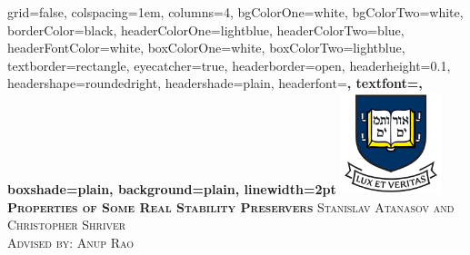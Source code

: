 \documentclass[landscape,final,a0paper,fontscale=0.26]{baposter}
\begin{document}
\begin{poster}%
  {
  grid=false,
  colspacing=1em,
  columns=4,
  bgColorOne=white,
  bgColorTwo=white,
  borderColor=black,
  headerColorOne=lightblue,
  headerColorTwo=blue,
  headerFontColor=white,
  boxColorOne=white,
  boxColorTwo=lightblue,
  textborder=rectangle,
  eyecatcher=true,
  headerborder=open,
  headerheight=0.1\textheight,
  headershape=roundedright,
  headershade=plain,
  headerfont=\Large\bf\textsc, %
  textfont={\setlength{\parindent}{1.5em}},
  boxshade=plain,
  background=plain,
  linewidth=2pt
  }
    {\includegraphics[height=8em]{images/Yale}} 
  {\bf\textsc{Properties of Some Real Stability Preservers}\vspace{0.5em}}
  {\textsc{ Stanislav Atanasov and Christopher Shriver\\ Advised by: Anup Rao}}
  {%

\setlength{\fboxsep}{0pt}%
\setlength{\fboxrule}{3pt}%
  }

    \newcommand{\colouredcircle}{%
      \tikz{\useasboundingbox (-0.2em,-0.32em) rectangle(0.2em,0.32em); \draw[draw=black,fill=lightblue,line width=0.03em] (0,0) circle(0.18em);}}


\end{poster}
\end{document}
